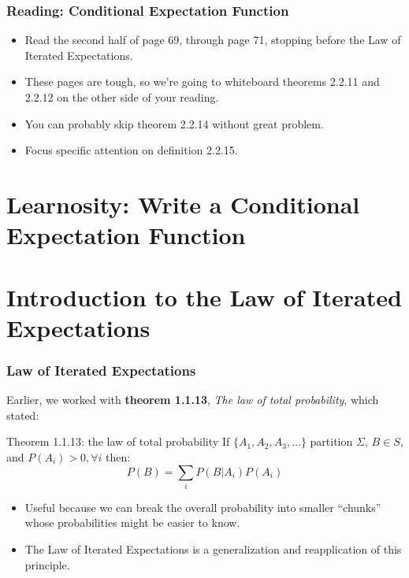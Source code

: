\documentclass[12pt, block=fill]{beamer}
\newcommand{\paul}[1]{{\color{red}#1}}
\begin{document}
 \begin{frame}
   \frametitle{Reading: Conditional Expectation Function}
   \begin{itemize}
   \item Read the second half of page 69, through page 71, stopping before the Law of Iterated Expectations.
   \item These pages are tough, so we're going to whiteboard
     theorems 2.2.11 and 2.2.12 on the other side of your reading.
   \item You can probably skip theorem 2.2.14 without great problem.
   \item Focus specific attention on definition 2.2.15.
   \end{itemize}
 \end{frame}
 
 
 \section{Learnosity: Write a Conditional Expectation Function}
 
 \section{Introduction to the Law of Iterated Expectations}

 \begin{frame}
   \frametitle{Law of Iterated Expectations}
   Earlier, we worked with \textbf{theorem 1.1.13}, \textit{The law of
     total probability}, which stated:
   
   \begin{block}{Theorem 1.1.13: the law of total probability}
     If $\{A_{1}, A_{2}, A_{3}, \dots\}$ partition $\Sigma$,
     $B \in S$, and $P(A_{i}) > 0, \forall i$ then:
     \[
       P(B) = \sum_{i} P(B|A_{i})P(A_{i})
     \]
   \end{block}
   \begin{itemize}
   \item Useful because we can break the overall probability into
     smaller ``chunks'' whose probabilities might be easier to know. 
   \item The Law of Iterated Expectations is a generalization and reapplication
     of this principle.
   \end{itemize} 
 \end{frame}
\end{document}
